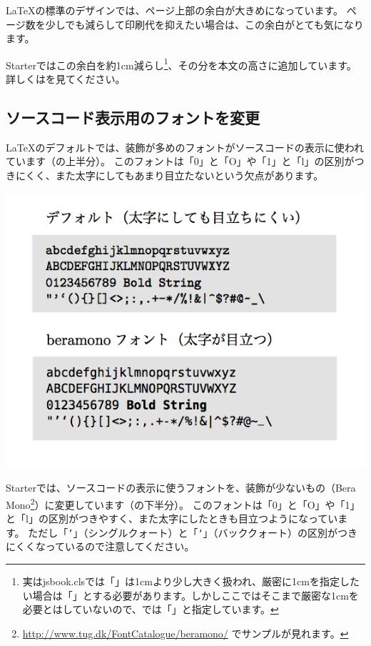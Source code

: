 \LaTeX{}の標準のデザインでは、ページ上部の余白が大きめになっています。
ページ数を少しでも減らして印刷代を抑えたい場合は、この余白がとても気になります。

Starterではこの余白を約1cm減らし\footnote{実はjsbook.clsでは「\reviewem{1cm}」は1cmより少し大きく扱われ、厳密に1cmを指定したい場合は「」とする必要があります。しかしここではそこまで厳密な1cmを必要とはしていないので、では「\reviewem{1cm}」と指定しています。}、その分を本文の高さに追加しています。
詳しくはを見てください。

\subsection*{ソースコード表示用のフォントを変更}
\label{sec:1-2-7}

\LaTeX{}のデフォルトでは、装飾が多めのフォントがソースコードの表示に使われています（の上半分）。
このフォントは「0」と「O」や「1」と「l」の区別がつきにくく、また太字にしてもあまり目立たないという欠点があります。

\begin{reviewimage}%
\includegraphics[width=0.7\maxwidth]{./images/chap01-starter/font_beramono.png}%
\label{image:chap01-starter:font_beramono}
\end{reviewimage}

Starterでは、ソースコードの表示に使うフォントを、装飾が少ないもの（Bera Mono\footnote{\url{http://www.tug.dk/FontCatalogue/beramono/} でサンプルが見れます。}）に変更しています（の下半分）。
このフォントは「0」と「O」や「1」と「l」の区別がつきやすく、また太字にしたときも目立つようになっています。
ただし「\texttt{'}」（シングルクォート）と「\texttt{`}」（バッククォート）の区別がつきにくくなっているので注意してください。


